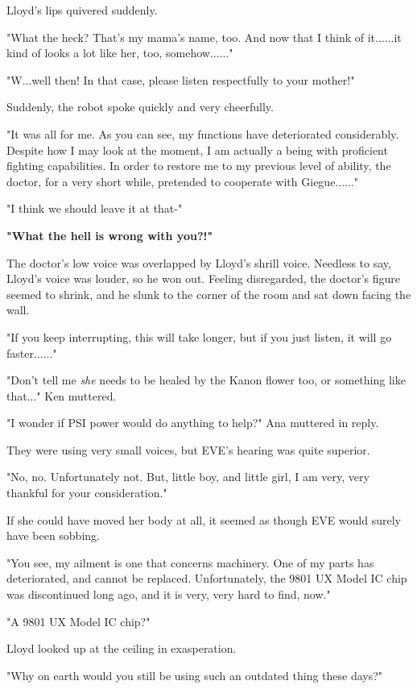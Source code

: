 \documentclass[
]{article}
\begin{document}
Lloyd's lips quivered suddenly.

"What the heck? That's my mama's name, too. And now that I think of
it......it kind of looks a lot like her, too, somehow......"

"W...well then! In that case, please listen respectfully to your
mother!"

Suddenly, the robot spoke quickly and very cheerfully.

"It was all for me. As you can see, my functions have deteriorated
considerably. Despite how I may look at the moment, I am actually a
being with proficient fighting capabilities. In order to restore me to
my previous level of ability, the doctor, for a very short while,
pretended to cooperate with Giegue......"

"I think we should leave it at that-"

\textbf{"What the hell is wrong with you?!"}

The doctor's low voice was overlapped by Lloyd's shrill voice. Needless
to say, Lloyd's voice was louder, so he won out. Feeling disregarded,
the doctor's figure seemed to shrink, and he slunk to the corner of the
room and sat down facing the wall.

"If you keep interrupting, this will take longer, but if you just
listen, it will go faster......"

"Don't tell me \emph{she} needs to be healed by the Kanon flower too, or
something like that..." Ken muttered.

"I wonder if PSI power would do anything to help?" Ana muttered in
reply.

They were using very small voices, but EVE's hearing was quite superior.

"No, no. Unfortunately not. But, little boy, and little girl, I am very,
very thankful for your consideration."

If she could have moved her body at all, it seemed as though EVE would
surely have been sobbing.

"You see, my ailment is one that concerns machinery. One of my parts has
deteriorated, and cannot be replaced. Unfortunately, the 9801 UX Model
IC chip was discontinued long ago, and it is very, very hard to find,
now."

"A 9801 UX Model IC chip?"

Lloyd looked up at the ceiling in exasperation.

"Why on earth would you still be using such an outdated thing these
days?"
\end{document}
